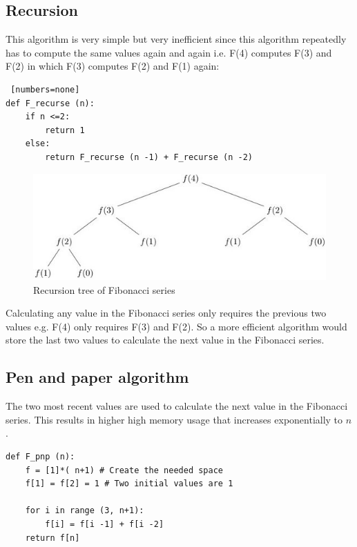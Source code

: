 \documentclass[10pt,a4paper]{article}
\begin{document}
\subsection{Recursion}

This algorithm is very simple but very ineﬃcient since this algorithm repeatedly
has to compute the same values again and again i.e. F(4) computes F(3) and
F(2) in which F(3) computes F(2) and F(1) again:

\begin{lstlisting} [numbers=none]
def F_recurse (n):
    if n <=2:
        return 1
    else:
        return F_recurse (n -1) + F_recurse (n -2)
\end{lstlisting}

\begin{figure} [h!]
    \centering
    \includegraphics[scale=0.7]{Fibonacci.JPG}
    \caption{Recursion tree of Fibonacci series}
\end{figure}

Calculating any value in the Fibonacci series only requires the previous
two values e.g. F(4) only requires F(3) and F(2). So a more eﬃcient algorithm
would store the last two values to calculate the next value in the Fibonacci
series.

\pagebreak

\subsection{Pen and paper algorithm}

The two most recent values are used to calculate the next value in the Fibonacci series. This
results in higher high memory usage that increases exponentially to $n$.

\begin{lstlisting}
def F_pnp (n):
    f = [1]*( n+1) # Create the needed space
    f[1] = f[2] = 1 # Two initial values are 1

    for i in range (3, n+1):
        f[i] = f[i -1] + f[i -2]
    return f[n]
\end{lstlisting}
\end{document}
